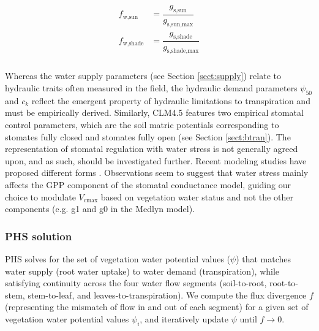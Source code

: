 \documentclass[draft,linenumbers]{agujournal}
\begin{document}
     \begin{linenomath*}
     \begin{eqnarray}
     \begin{aligned}
     \label{eq:stress}
     f_{\text{w,sun}}         &= \dfrac{g_{\text{s,sun}}}{g_{\text{s,sun,max}}} \\
     f_{\text{w,shade}}     &= \dfrac{g_{\text{s,shade}}}{g_{\text{s,shade,max}}} \\
     \end{aligned}
     \end{eqnarray}
     \end{linenomath*}
    
     Whereas the water supply parameters (see Section \ref{sect:supply}) relate to hydraulic traits often measured in the field, 
     the hydraulic demand parameters $\psi_{50}$ and $c_k$ reflect the emergent property of hydraulic limitations to transpiration and must be empirically derived. 
     Similarly, CLM4.5 features two empirical stomatal control parameters, which are the soil matric potentials 
     corresponding to stomates fully closed and stomates fully open (see Section \ref{sect:btran}).
     The representation of stomatal regulation with water stress is not generally agreed upon, and as such, should be investigated further. 
     Recent modeling studies have proposed different forms \citep{sperry2017,xu2016,christoffersen2016}. 
     Observations \citep{lin2018} seem to suggest that water stress mainly affects the GPP component of the stomatal conductance model, guiding our choice to modulate $V_{\text{cmax}}$ based on vegetation water status and not the other components (e.g. g1 and g0 in the Medlyn model).

    \subsubsection{PHS solution}
    \label{sect:solution}
    
    PHS solves for the set of vegetation water potential values ($\psi$) that matches water supply
    (root water uptake) to water demand (transpiration), while satisfying continuity across the four water flow
    segments (soil-to-root, root-to-stem, stem-to-leaf, and leaves-to-transpiration). 
    We compute the flux divergence $f$ (representing the mismatch of flow in and out of each segment)
    for a given set of vegetation water potential values $\psi_i$, and iteratively update $\psi$ until $f\to0$.
    
\end{document}
